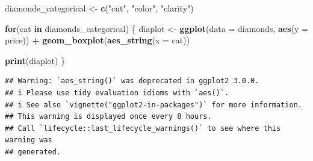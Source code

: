\documentclass[
]{book}
\newenvironment{Shaded}{\begin{snugshade}}{\end{snugshade}}
\newcommand{\AttributeTok}[1]{\textcolor[rgb]{0.13,0.29,0.53}{#1}}
\newcommand{\ControlFlowTok}[1]{\textcolor[rgb]{0.13,0.29,0.53}{\textbf{#1}}}
\newcommand{\FunctionTok}[1]{\textcolor[rgb]{0.13,0.29,0.53}{\textbf{#1}}}
\newcommand{\NormalTok}[1]{#1}
\newcommand{\OtherTok}[1]{\textcolor[rgb]{0.56,0.35,0.01}{#1}}
\newcommand{\SpecialCharTok}[1]{\textcolor[rgb]{0.81,0.36,0.00}{\textbf{#1}}}
\newcommand{\StringTok}[1]{\textcolor[rgb]{0.31,0.60,0.02}{#1}}
\begin{document}
\begin{Shaded}
\begin{Highlighting}[]
\NormalTok{diamonds\_categorical }\OtherTok{\textless{}{-}} \FunctionTok{c}\NormalTok{(}\StringTok{"cut"}\NormalTok{, }\StringTok{"color"}\NormalTok{, }\StringTok{"clarity"}\NormalTok{)}

\ControlFlowTok{for}\NormalTok{(cat }\ControlFlowTok{in}\NormalTok{ diamonds\_categorical) \{}
\NormalTok{  diaplot }\OtherTok{\textless{}{-}} \FunctionTok{ggplot}\NormalTok{(}\AttributeTok{data =}\NormalTok{ diamonds, }\FunctionTok{aes}\NormalTok{(}\AttributeTok{y =}\NormalTok{ price)) }\SpecialCharTok{+} 
    \FunctionTok{geom\_boxplot}\NormalTok{(}\FunctionTok{aes\_string}\NormalTok{(}\AttributeTok{x =}\NormalTok{ cat))}
  
  \FunctionTok{print}\NormalTok{(diaplot)}
\NormalTok{\}}
\end{Highlighting}
\end{Shaded}

\begin{verbatim}
## Warning: `aes_string()` was deprecated in ggplot2 3.0.0.
## i Please use tidy evaluation idioms with `aes()`.
## i See also `vignette("ggplot2-in-packages")` for more information.
## This warning is displayed once every 8 hours.
## Call `lifecycle::last_lifecycle_warnings()` to see where this warning was
## generated.
\end{verbatim}
\end{document}
